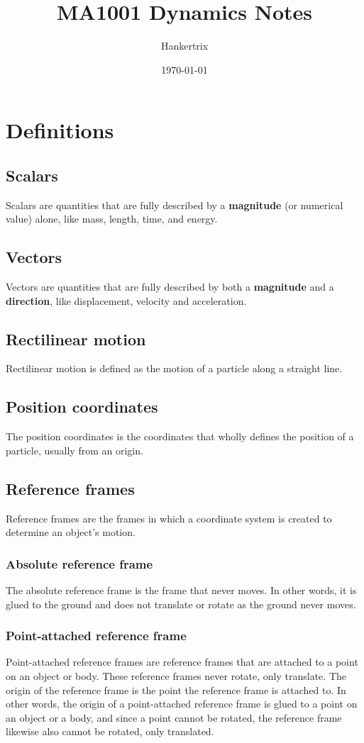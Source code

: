 \documentclass[11pt]{article}
\author{Hankertrix}
\date{\today}
\title{MA1001 Dynamics Notes}
\begin{document}
\maketitle
\setcounter{tocdepth}{2}
\tableofcontents \clearpage\section{Definitions}
\label{sec:org1106c2c}

\subsection{Scalars}
\label{sec:org1f45394}
Scalars are quantities that are fully described by a \textbf{magnitude} (or numerical value) alone, like mass, length, time, and energy.
\subsection{Vectors}
\label{sec:orge306427}
Vectors are quantities that are fully described by both a \textbf{magnitude} and a \textbf{direction}, like displacement, velocity and acceleration.
\subsection{Rectilinear motion}
\label{sec:org1684a7d}
Rectilinear motion is defined as the motion of a particle along a straight line.
\subsection{Position coordinates}
\label{sec:org99c15d0}
The position coordinates is the coordinates that wholly defines the position of a particle, usually from an origin.
\subsection{Reference frames}
\label{sec:orgda1f4b0}
Reference frames are the frames in which a coordinate system is created to determine an object's motion.
\subsubsection{Absolute reference frame}
\label{sec:org0338a70}
The absolute reference frame is the frame that never moves. In other words, it is glued to the ground and does not translate or rotate as the ground never moves.
\subsubsection{Point-attached reference frame}
\label{sec:orgc0cbb17}
Point-attached reference frames are reference frames that are attached to a point on an object or body. These reference frames never rotate, only translate. The origin of the reference frame is the point the reference frame is attached to. In other words, the origin of a point-attached reference frame is glued to a point on an object or a body, and since a point cannot be rotated, the reference frame likewise also cannot be rotated, only translated.
\end{document}
